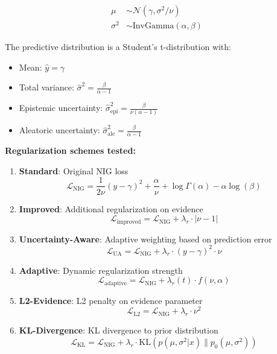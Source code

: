 \begin{align}
\mu &\sim \mathcal{N}(\gamma, \sigma^2/\nu) \\
\sigma^2 &\sim \text{InvGamma}(\alpha, \beta)
\end{align}

The predictive distribution is a Student's t-distribution \cite{murphy2012machine} with:
\begin{itemize}
\item Mean: $\hat{y} = \gamma$
\item Total variance: $\hat{\sigma}^2 = \frac{\beta}{\alpha - 1}$
\item Epistemic uncertainty: $\hat{\sigma}_{\text{epi}}^2 = \frac{\beta}{\nu(\alpha - 1)}$
\item Aleatoric uncertainty: $\hat{\sigma}_{\text{ale}}^2 = \frac{\beta}{\alpha - 1}$
\end{itemize}

\textbf{Regularization schemes tested:}

\begin{enumerate}
\item \textbf{Standard}: Original NIG loss \cite{amini2020deep}
$$\mathcal{L}_{\text{NIG}} = \frac{1}{2\nu}(y - \gamma)^2 + \frac{\alpha}{\nu} + \log\Gamma(\alpha) - \alpha\log(\beta)$$

\item \textbf{Improved}: Additional regularization on evidence \cite{amini2020deep}
$$\mathcal{L}_{\text{improved}} = \mathcal{L}_{\text{NIG}} + \lambda_r \cdot |\nu - 1|$$

\item \textbf{Uncertainty-Aware}: Adaptive weighting based on prediction error
$$\mathcal{L}_{\text{UA}} = \mathcal{L}_{\text{NIG}} + \lambda_r \cdot (y - \gamma)^2 \cdot \nu$$

\item \textbf{Adaptive}: Dynamic regularization strength
$$\mathcal{L}_{\text{adaptive}} = \mathcal{L}_{\text{NIG}} + \lambda_r(t) \cdot f(\nu, \alpha)$$

\item \textbf{L2-Evidence}: L2 penalty on evidence parameter
$$\mathcal{L}_{\text{L2}} = \mathcal{L}_{\text{NIG}} + \lambda_r \cdot \nu^2$$

\item \textbf{KL-Divergence}: KL divergence to prior distribution
$$\mathcal{L}_{\text{KL}} = \mathcal{L}_{\text{NIG}} + \lambda_r \cdot \text{KL}(p(\mu, \sigma^2|x) \| p_0(\mu, \sigma^2))$$
\end{enumerate}

